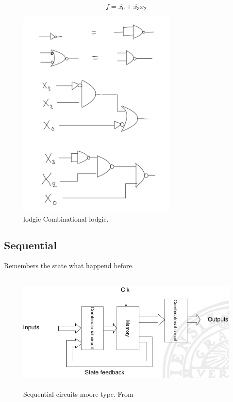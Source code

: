 \begin{equation}
    f= \overline{x_0} + \overline{x_3}x_2    
\end{equation}

\begin{figure}[h]
    \centering
    \includegraphics[width=8cm]{image/example-cobinational-lodgic.pdf}
    \caption{lodgic Combinational lodgic.}
\end{figure}
 

\newpage
\subsection{Sequential}
Remembers the state what happend before.

\begin{figure}[h]
    \centering
    \includegraphics[width=12cm, height=6cm]{image/sequential-circuits-moore-type.png}
    \caption{Sequential circuits moore type. From \cite{}}
\end{figure}

